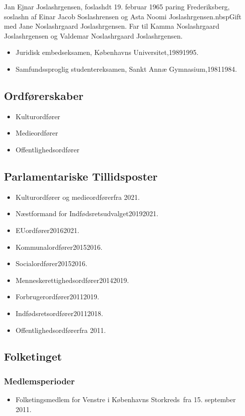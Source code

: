 \documentclass[11pt, a4paper]{awesome-cv}
\begin{document}
\makecvheader[R]
\makelettertitle
\begin{cvletter}
Jan Ejnar Joslashrgensen, foslashdt 19. februar 1965 paring Frederiksberg, soslashn af Einar Jacob Soslashrensen og Asta Noomi Joslashrgensen.nbspGift med Jane Noslashrgaard Joslashrgensen. Far til Kamma Noslashrgaard Joslashrgensen og Valdemar Noslashrgaard Joslashrgensen.

\begin{itemize}
\item Juridisk embedseksamen, Københavns Universitet,19891995.
\item Samfundssproglig studentereksamen, Sankt Annæ Gymnasium,19811984.
\end{itemize}
\subsection*{Ordførerskaber}
\begin{itemize}
\item Kulturordfører
\item Medieordfører
\item Offentlighedsordfører
\end{itemize}
\subsection*{Parlamentariske Tillidsposter}
\begin{itemize}
\item Kulturordfører og medieordførerfra 2021.
\item Næstformand for Indfødsretsudvalget20192021.
\item EUordfører20162021.
\item Kommunalordfører20152016.
\item Socialordfører20152016.
\item Menneskerettighedsordfører20142019.
\item Forbrugerordfører20112019.
\item Indfødsretsordfører20112018.
\item Offentlighedsordførerfra 2011.
\end{itemize}
\subsection*{Folketinget}
\subsubsection*{Medlemsperioder}
\begin{itemize}
\item Folketingsmedlem for Venstre i Københavns Storkreds fra 15. september 2011.
\end{itemize}

\end{cvletter}
\end{document}
